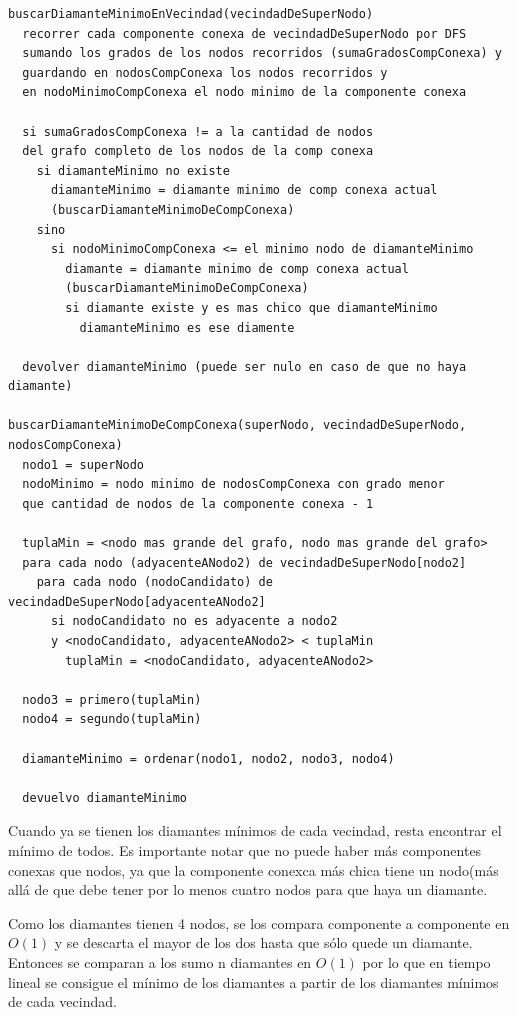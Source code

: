 \documentclass[a4paper,11pt] {article}
\begin{document}
\begin{verbatim}
buscarDiamanteMinimoEnVecindad(vecindadDeSuperNodo)
  recorrer cada componente conexa de vecindadDeSuperNodo por DFS
  sumando los grados de los nodos recorridos (sumaGradosCompConexa) y
  guardando en nodosCompConexa los nodos recorridos y
  en nodoMinimoCompConexa el nodo minimo de la componente conexa

  si sumaGradosCompConexa != a la cantidad de nodos
  del grafo completo de los nodos de la comp conexa
    si diamanteMinimo no existe
      diamanteMinimo = diamante minimo de comp conexa actual 
      (buscarDiamanteMinimoDeCompConexa)
    sino
      si nodoMinimoCompConexa <= el minimo nodo de diamanteMinimo
        diamante = diamante minimo de comp conexa actual 
        (buscarDiamanteMinimoDeCompConexa)
        si diamante existe y es mas chico que diamanteMinimo
          diamanteMinimo es ese diamente

  devolver diamanteMinimo (puede ser nulo en caso de que no haya diamante)

buscarDiamanteMinimoDeCompConexa(superNodo, vecindadDeSuperNodo, nodosCompConexa)
  nodo1 = superNodo
  nodoMinimo = nodo minimo de nodosCompConexa con grado menor 
  que cantidad de nodos de la componente conexa - 1

  tuplaMin = <nodo mas grande del grafo, nodo mas grande del grafo>
  para cada nodo (adyacenteANodo2) de vecindadDeSuperNodo[nodo2]
    para cada nodo (nodoCandidato) de vecindadDeSuperNodo[adyacenteANodo2]
      si nodoCandidato no es adyacente a nodo2 
      y <nodoCandidato, adyacenteANodo2> < tuplaMin
        tuplaMin = <nodoCandidato, adyacenteANodo2>

  nodo3 = primero(tuplaMin)
  nodo4 = segundo(tuplaMin)

  diamanteMinimo = ordenar(nodo1, nodo2, nodo3, nodo4)

  devuelvo diamanteMinimo

\end{verbatim}

Cuando ya se tienen los diamantes mínimos de cada vecindad, resta encontrar el mínimo de todos. Es importante notar que no puede haber más componentes conexas que nodos, ya que la componente conexca más chica tiene un nodo(más allá de que debe tener por lo menos cuatro nodos para que haya un diamante.

Como los diamantes tienen 4 nodos, se los compara componente a componente en $O(1)$ y se descarta el mayor de los dos hasta que sólo quede un diamante. Entonces se comparan a los sumo n diamantes en $O(1)$ por lo que en tiempo lineal se consigue el mínimo de los diamantes a partir de los diamantes mínimos de cada vecindad.
\end{document}

